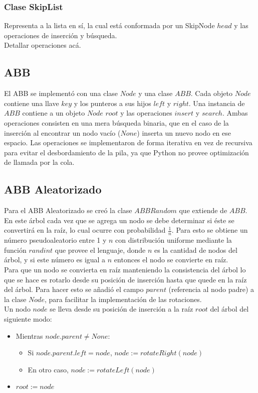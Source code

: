 \documentclass[12pt,letterpaper]{article}
\begin{document}
\subsubsection{Clase SkipList}
Representa a la lista en sí, la cual está conformada por un SkipNode $head$ y las operaciones de inserción y búsqueda.\\

Detallar operaciones acá.


\subsection{ABB}
El ABB se implementó con una clase $Node$ y una clase $ABB$. Cada objeto $Node$ contiene una llave $key$ y los punteros a sus hijos $left$ y $right$. Una instancia de $ABB$ contiene a un objeto $Node$ $root$ y las operaciones $insert$ y $search$. Ambas operaciones consisten en una mera búsqueda binaria, que en el caso de la inserción al encontrar un nodo vacío ($None$) inserta un nuevo nodo en ese espacio. Las operaciones se implementaron de forma iterativa en  vez de recursiva para evitar el desbordamiento de la pila, ya que Python no provee optimización de llamada por la cola.

\subsection{ABB Aleatorizado}
Para el ABB Aleatorizado se creó la clase $ABBRandom$ que extiende de $ABB$. En este árbol cada vez que se agrega un nodo se debe determinar si éste se convertirá en la raíz, lo cual ocurre con probabilidad $\frac{1}{n}$. Para esto se obtiene un número pseudoaleatorio entre 1 y $n$ con distribución uniforme mediante la función $randint$ que provee el lenguaje, donde $n$ es la cantidad de nodos del árbol, y si este número es igual a $n$ entonces el nodo se convierte en raíz.\\

Para que un nodo se convierta en raíz manteniendo la consistencia del árbol lo que se hace es rotarlo desde su posición de inserción hasta que quede en la raíz del árbol. Para hacer esto se añadió el campo $parent$ (referencia al nodo padre) a la clase $Node$, para facilitar la implementación de las rotaciones.\\

Un nodo $node$ se lleva desde su posición de inserción a la raíz $root$ del árbol del siguiente modo:
\begin{itemize}
\item	Mientras $node.parent \not= None$:
	\begin{itemize}
	\item	Si $node.parent.left = node$, $node := rotateRight(node)$
	\item	En otro caso, $node := rotateLeft(node)$
	\end{itemize}
\item	$root := node$
\end{itemize}
\end{document}

